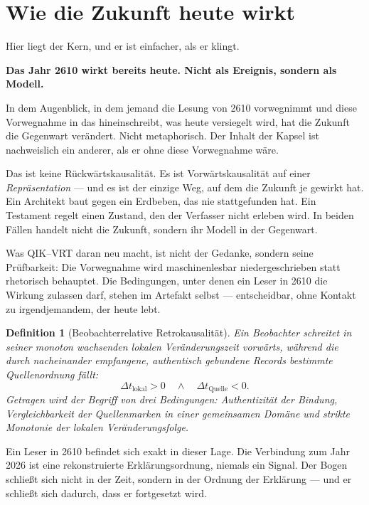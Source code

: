 \documentclass[11pt,a4paper]{article}
\newtheorem{definition}{Definition}[section]
\theoremstyle{remark}
\newcommand{\qikvrt}{QIK--VRT}
\begin{document}
\section{Wie die Zukunft heute wirkt}

Hier liegt der Kern, und er ist einfacher, als er klingt.

\textbf{Das Jahr 2610 wirkt bereits heute. Nicht als Ereignis, sondern als
Modell.}

In dem Augenblick, in dem jemand die Lesung von 2610 vorwegnimmt und diese
Vorwegnahme in das hineinschreibt, was heute versiegelt wird, hat die
Zukunft die Gegenwart verändert. Nicht metaphorisch. Der Inhalt der Kapsel
ist nachweislich ein anderer, als er ohne diese Vorwegnahme wäre.

Das ist keine Rückwärtskausalität. Es ist Vorwärtskausalität auf einer
\emph{Repräsentation} --- und es ist der einzige Weg, auf dem die Zukunft je
gewirkt hat. Ein Architekt baut gegen ein Erdbeben, das nie stattgefunden
hat. Ein Testament regelt einen Zustand, den der Verfasser nicht erleben
wird. In beiden Fällen handelt nicht die Zukunft, sondern ihr Modell in der
Gegenwart.

Was \qikvrt{} daran neu macht, ist nicht der Gedanke, sondern seine
Prüfbarkeit: Die Vorwegnahme wird maschinenlesbar niedergeschrieben statt
rhetorisch behauptet. Die Bedingungen, unter denen ein Leser in 2610 die
Wirkung zulassen darf, stehen im Artefakt selbst --- entscheidbar, ohne
Kontakt zu irgendjemandem, der heute lebt.

\begin{definition}[Beobachterrelative Retrokausalität]
\label{def:orr}
Ein Beobachter schreitet in seiner monoton wachsenden lokalen
Veränderungszeit vorwärts, während die durch nacheinander empfangene,
authentisch gebundene Records bestimmte Quellenordnung fällt:
\begin{equation}
  \Delta t_{\text{lokal}} > 0
  \quad \wedge \quad
  \Delta t_{\text{Quelle}} < 0 .
\end{equation}
Getragen wird der Begriff von drei Bedingungen: Authentizität der Bindung,
Vergleichbarkeit der Quellenmarken in einer gemeinsamen Domäne und strikte
Monotonie der lokalen Veränderungsfolge.
\end{definition}

Ein Leser in 2610 befindet sich exakt in dieser Lage. Die Verbindung zum
Jahr 2026 ist eine rekonstruierte Erklärungsordnung, niemals ein Signal.
Der Bogen schließt sich nicht in der Zeit, sondern in der Ordnung der
Erklärung --- und er schließt sich dadurch, dass er fortgesetzt wird.
\end{document}
